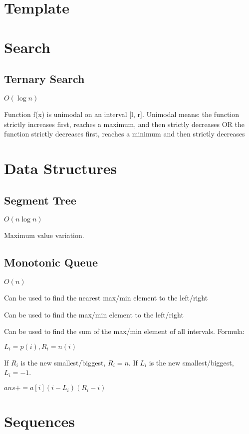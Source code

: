 \documentclass{article}
\begin{document}
\tableofcontents 

\section{Template}


\section{Search}
\subsection{Ternary Search}
$O(\log{n})$

Function f(x) is unimodal on an interval [l, r]. Unimodal means: the function strictly increases first, reaches a maximum, and then strictly decreases OR the function strictly decreases first, reaches a minimum and then strictly decreases


\section{Data Structures}

\subsection{Segment Tree}
$O(n \log n)$

Maximum value variation.


\subsection{Monotonic Queue}
$O(n)$

Can be used to find the nearest max/min element to the left/right 

Can be used to find the max/min element to the left/right

Can be used to find the sum of the max/min element of all intervals. Formula:

$L_i = p(i), R_i = n(i)$ 

If $R_i$ is the new smallest/biggest, $R_i = n$. If $L_i$ is the new smallest/biggest, $L_i = -1$.

$
ans += a[i](i-L_i) (R_i-i)
$

\section{Sequences}
\end{document}
